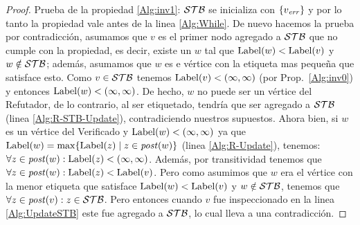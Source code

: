 \begin{proof}
	Prueba de la propiedad \ref{Alg:inv1}: $\mathcal{STB}$ se inicializa con $\{v_{\mathit{err}} \}$ y por lo tanto la propiedad vale antes de la linea \ref{Alg:While}. 
De nuevo hacemos la prueba por contradicción, asumamos que $v$ es el primer nodo agregado a $\mathcal{STB}$ que no cumple con la propiedad, es decir, existe un $w$ tal que $\operatorname{Label}(w) < \operatorname{Label}(v)$ y
$w \notin \mathcal{STB}$; además, asumamos que $w$ es e vértice con la etiqueta mas pequeña que satisface esto. 
Como $v \in \mathcal{STB}$ tenemos $\operatorname{Label}(v)<(\infty, \infty)$ (por Prop.~\ref{Alg:inv0}) y entonces $\operatorname{Label}(w)< (\infty, \infty)$. 
De hecho, $w$ no puede ser un vértice del Refutador, de lo contrario, al ser etiquetado, tendría que ser agregado a $\mathcal{STB}$ (linea \ref{Alg:R-STB-Update}), 
contradiciendo nuestros supuestos. 
Ahora bien, si $w$ es un vértice del Verificado y $\operatorname{Label}(w) < (\infty, \infty)$
ya que $\operatorname{Label}(w) = \max\{\operatorname{Label}(z) \mid z \in \mathit{post}(w)\}$ (linea \ref{Alg:R-Update}), tenemos: $\forall z \in \mathit{post}(w) : \operatorname{Label}(z) < (\infty, \infty)$.
Además, por transitividad tenemos que $\forall z \in \mathit{post}(w) : \operatorname{Label}(z) < \operatorname{Label}(v)$. Pero como asumimos que 
$w$ era el vértice con la menor etiqueta que satisface $\operatorname{Label}(w) < \operatorname{Label}(v)$ y $w \notin \mathcal{STB}$, tenemos que $\forall z \in \mathit{post}(v) : z \in \mathcal{STB}$. Pero entonces cuando $v$ fue inspeccionado en la linea \ref{Alg:UpdateSTB} este fue agregado a $\mathcal{STB}$, 
lo cual lleva a una contradicción.


\end{proof}
